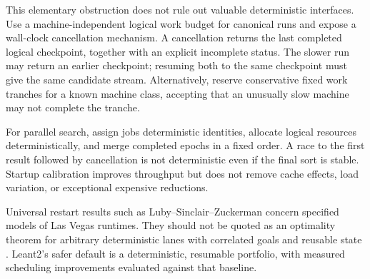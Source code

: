 This elementary obstruction does not rule out valuable deterministic interfaces. Use a machine-independent logical work budget for canonical runs and expose a wall-clock cancellation mechanism. A cancellation returns the last completed logical checkpoint, together with an explicit incomplete status. The slower run may return an earlier checkpoint; resuming both to the same checkpoint must give the same candidate stream. Alternatively, reserve conservative fixed work tranches for a known machine class, accepting that an unusually slow machine may not complete the tranche.

For parallel search, assign jobs deterministic identities, allocate logical resources deterministically, and merge completed epochs in a fixed order. A race to the first result followed by cancellation is not deterministic even if the final sort is stable. Startup calibration improves throughput but does not remove cache effects, load variation, or exceptional expensive reductions.

Universal restart results such as Luby--Sinclair--Zuckerman concern specified models of Las Vegas runtimes. They should not be quoted as an optimality theorem for arbitrary deterministic lanes with correlated goals and reusable state \cite{luby}. Leant2's safer default is a deterministic, resumable portfolio, with measured scheduling improvements evaluated against that baseline.
